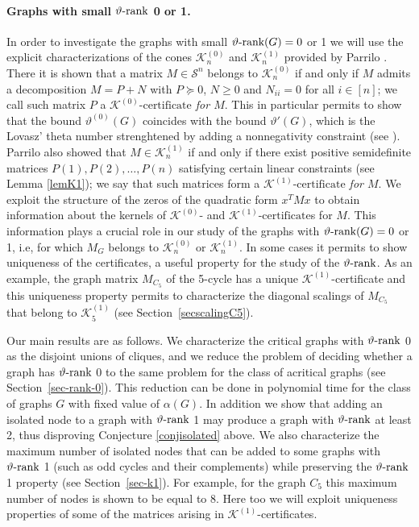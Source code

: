 \documentclass[11pt]{article}
\newcommand{\kzeroc}{\MK^{(0)}\text{-certificate}}
\newcommand{\konec}{\MK^{(1)}\text{-certificate}}
\numberwithin{equation}{section}
\newcommand{\MK}{{\mathcal K}}
\newcommand{\rrank}{\vartheta\text{\rm -rank}}
\begin{document}
\paragraph*{Graphs with small $\rrank$ 0 or 1.}
In order to investigate the graphs with small $\rrank (G)=0$ or 1 we will use the explicit characterizations of the cones $\mathcal K^{(0)}_n$ and $\mathcal K^{(1)}_n$ provided by Parrilo \cite{Parrilo-thesis-2000}.
There it is shown that a matrix $M\in \mathcal S^n$ belongs to $\MK^{(0)}_n$ if and only if $M$ admits a decomposition $M=P+N$ with  $P\succeq 0$, $N\geq 0$ and $N_{ii}=0$ for all $i\in [n]$; we call such matrix $P$ a {\em $\kzeroc$ for $M$}.
This in particular permits to show that the bound $\vartheta^{(0)}(G)$ coincides with the bound $\vartheta'(G)$, which is the Lovasz' theta number strenghtened by adding a nonnegativity constraint (see \cite{dKP2002}).   Parrilo \cite{Parrilo-thesis-2000} also showed that $M\in \MK_n^{(1)}$ if and only if there exist positive semidefinite matrices $P(1), P(2), \dots, P(n)$ satisfying certain linear constraints (see Lemma \ref{lemK1}); we say that such matrices form a {\em $\konec$ for $M$}. We exploit the structure of the zeros of the quadratic form $x^TMx$ to obtain information about the kernels of  $\MK^{(0)}$- and $\konec$s for $M$. This information plays a crucial  role 
in our study of the graphs with $\rrank(G)=0$ or 1, i.e, for which $M_G$ belongs to $\MK_n^{(0)}$ or $\MK_n^{(1)}$. In some cases it permits to show uniqueness of the certificates, a useful property for the study of the $\rrank$. As an example,  the graph matrix $M_{C_5}$ of the 5-cycle has a unique $\mathcal K^{(1)}$-certificate and this uniqueness  property  permits to characterize the diagonal scalings of $M_{C_5}$ that belong to $\mathcal K^{(1)}_5$ (see Section~\ref{secscalingC5}).

Our main results are as follows. We characterize the critical graphs with $\rrank$ 0 as the disjoint unions of cliques,  and we reduce the problem of deciding whether a graph has $\rrank$ 0 to the same problem for the class of acritical graphs (see Section~\ref{sec-rank-0}). This reduction can be done in polynomial time for the class of graphs $G$ with fixed value of $\alpha(G)$. In addition we show  that adding an isolated node to a graph with $\rrank$ 1 may produce a graph with $\rrank$ at least 2, thus disproving Conjecture \ref{conjisolated} above. %
We also  characterize the maximum number of isolated nodes that can be added to some graphs with $\rrank$ 1 (such as odd cycles and their complements) while preserving the $\rrank$ 1 property (see Section~\ref{sec-k1}). For example, for the graph $C_5$  this maximum number of nodes is shown to be equal to 8.
Here too we will exploit uniqueness properties of some of the matrices arising in $\mathcal K^{(1)}$-certificates.
\end{document}
